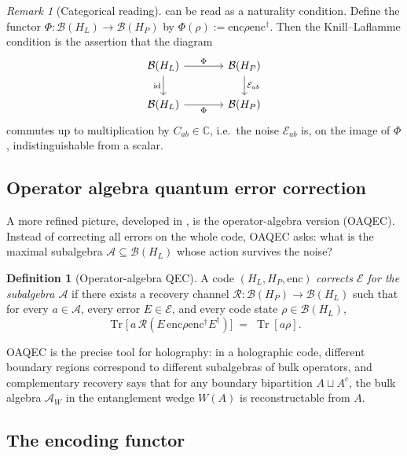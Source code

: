 \documentclass[12pt]{article}
\theoremstyle{definition}
\newtheorem{definition}[theorem]{Definition}
\theoremstyle{remark}
\newtheorem{remark}[theorem]{Remark}
\newcommand{\enc}{\mathrm{enc}}
\newcommand{\Tr}{\operatorname{Tr}}
\newcommand{\id}{\mathrm{id}}
\begin{document}
\begin{remark}[Categorical reading]
 can be read as a naturality condition. Define the functor $\Phi\colon \mathcal{B}(H_L) \to \mathcal{B}(H_P)$ by $\Phi(\rho) := \enc \rho \enc^\dagger$. Then the Knill--Laflamme condition is the assertion that the diagram
\[
\begin{tikzcd}[column sep=large]
\mathcal{B}(H_L) \arrow[r,"\Phi"] \arrow[d,"\id"'] & \mathcal{B}(H_P) \arrow[d,"\mathcal{E}_{ab}"] \\
\mathcal{B}(H_L) \arrow[r,"\Phi"'] & \mathcal{B}(H_P)
\end{tikzcd}
\]
commutes up to multiplication by $C_{ab} \in \mathbb{C}$, i.e.\ the noise $\mathcal{E}_{ab}$ is, on the image of $\Phi$, indistinguishable from a scalar.
\end{remark}

\subsection{Operator algebra quantum error correction}

A more refined picture, developed in \cite{beny2007,almheiridongharlow2015,harlow2017}, is the operator-algebra version (OAQEC). Instead of correcting all errors on the whole code, OAQEC asks: what is the maximal subalgebra $\mathcal{A} \subseteq \mathcal{B}(H_L)$ whose action survives the noise?

\begin{definition}[Operator-algebra QEC]
\label{def:oaqec}
A code $(H_L,H_P,\enc)$ \emph{corrects $\mathcal{E}$ for the subalgebra $\mathcal{A}$} if there exists a recovery channel $\mathcal{R}\colon \mathcal{B}(H_P) \to \mathcal{B}(H_L)$ such that for every $a \in \mathcal{A}$, every error $E \in \mathcal{E}$, and every code state $\rho \in \mathcal{B}(H_L)$,
\[
\Tr\bigl[\,a\, \mathcal{R}(E\, \enc\rho\enc^\dagger E^\dagger)\bigr] \;=\; \Tr[a\rho].
\]
\end{definition}

OAQEC is the precise tool for holography: in a holographic code, different boundary regions correspond to different subalgebras of bulk operators, and complementary recovery says that for any boundary bipartition $A \sqcup A^c$, the bulk algebra $\mathcal{A}_W$ in the entanglement wedge $W(A)$ is reconstructable from $A$.

\subsection{The encoding functor}
\end{document}
